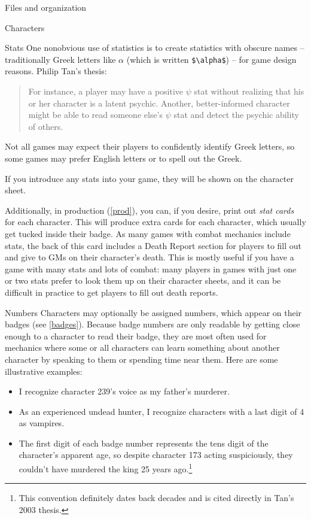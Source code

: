 \documentclass[sheet]{GameTexBase}
\begin{document}
\begin{section}{Files and organization}
\begin{subsection}{Characters}
\begin{subsubsection}{Stats}
One nonobvious use of statistics is to create statistics with obscure names -- traditionally Greek letters like $\alpha$ (which is written \lstinline|$\alpha$|) -- for game design reasons.  Philip Tan's thesis:
\begin{quote}
For instance, a player may have a positive $\psi$ stat without realizing that his
or her character is a latent psychic. Another, better-informed character might be able to
read someone else’s $\psi$ stat and detect the psychic ability of others.
\end{quote}
Not all games may expect their players to confidently identify Greek letters, so some games may prefer English letters or to spell out the Greek.

If you introduce any stats into your game, they will be shown on the character sheet.  

Additionally, in production (\ref{prod}), you can, if you desire, print out \emph{stat cards} for each character.  This will produce extra cards for each character, which usually get tucked inside their badge.  As many games with combat mechanics include stats, the back of this card includes a Death Report section for players to fill out and give to GMs on their character's death.  This is mostly useful if you have a game with many stats and lots of combat: many players in games with just one or two stats prefer to look them up on their character sheets, and it can be difficult in practice to get players to fill out death reports.
\end{subsubsection}
\begin{subsubsection}{Numbers}
\label{charnumber}
Characters may optionally be assigned numbers, which appear on their badges (see \ref{badges}). Because badge numbers are only readable by getting close enough to a character to read their badge,
they are most often used for mechanics where some or all characters can learn something about another character by speaking to them or spending time near them.  Here are some illustrative examples:
\begin{itemize}
\item I recognize character 239's voice as my father's murderer.
\item As an experienced undead hunter, I recognize characters with a last digit of 4 as vampires.
\item The first digit of each badge number represents the tens digit of the character's apparent age, so despite character 173 acting suspiciously, they couldn't have murdered the king 25 years ago.\footnote{This convention definitely dates back decades and is cited directly in Tan's 2003 thesis.}
\end{itemize}


\end{subsubsection}
\end{subsection}
\end{section}
\end{document}
